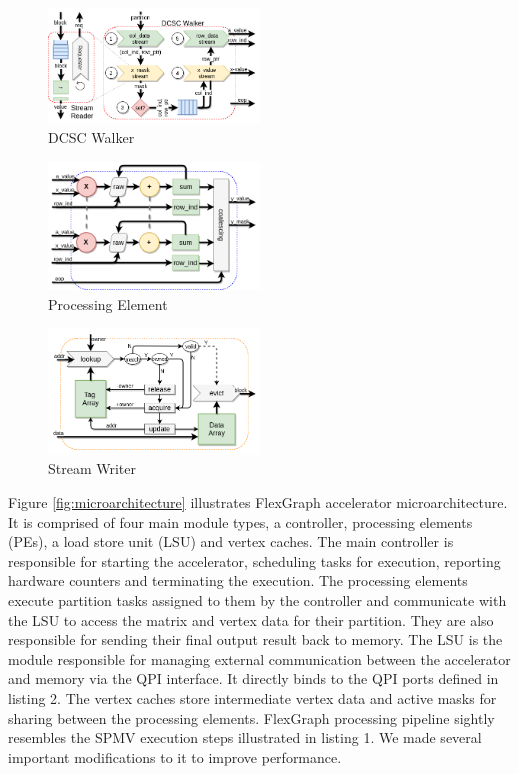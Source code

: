 \begin{figure}[htbp]
\centering
\includegraphics[width=0.5\textwidth]{figures/micro_walker}
\caption{DCSC Walker}
\label{fig:micro_walker}
\end{figure}

\begin{figure}[htbp]
\centering
\includegraphics[width=0.5\textwidth]{figures/micro_pe}
\caption{Processing Element}
\label{fig:micro_pe}
\end{figure}

\begin{figure}[htbp]
\centering
\includegraphics[width=0.5\textwidth]{figures/micro_writer}
\caption{Stream Writer}
\label{fig:micro_writer}
\end{figure}

Figure \ref{fig:microarchitecture} illustrates FlexGraph accelerator microarchitecture. It is comprised of four main module types, a controller, processing elements (PEs), a load store unit (LSU) and vertex caches. The main controller is responsible for starting the accelerator, scheduling tasks for execution, reporting hardware counters and terminating the execution. The processing elements execute partition tasks assigned to them by the controller and communicate with the LSU to access the matrix and vertex data for their partition. They are also responsible for sending their final output result back to memory. The LSU is the module responsible for managing external communication between the accelerator and memory via the QPI interface. It directly binds to the QPI ports defined in listing 2.
The vertex caches store intermediate vertex data and active masks for sharing between the processing elements. FlexGraph processing pipeline sightly resembles the SPMV execution steps illustrated in listing 1. We made several important modifications to it to improve performance.  

